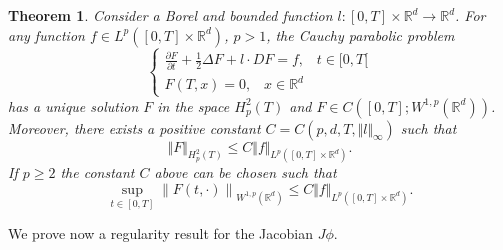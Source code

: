 \documentclass[a4paper,11pt]{article}
\newtheorem{theorem}{Theorem}
\begin{document}

\begin{theorem}
\label{KR} Consider a Borel and bounded function $l:[0,T]\times
\mathbb{R}^{d}\rightarrow \mathbb{R}^{d}$. For any function $f\in
L^{p} ([0,T]\times \mathbb{R}^{d})$, $p>1$, the Cauchy parabolic
problem
\begin{equation}
\left\{ \begin{aligned} \frac{\partial F}{\partial t}+ \frac{1}{2}
\Delta F + l \cdot D F = f,\;\; \; t \in [0,T[ \\ F(T,x)=0,\;\;\; x
\in \mathbb{R} ^d
\end{aligned}\right.   \label{eq:cauchy-parabolic-problem}
\end{equation}
has a unique solution $F$ in the space $H_{p}^{2}(T)$ and $F\in C( [  0,T]
;W^{1,p}(  \mathbb{R}^{d}) )  $. Moreover,
there exists a positive constant $C=C(p,
 d,T,\Vert l\Vert _{\infty
})$ such that
\begin{equation}
\Vert F\Vert _{{H_{p}^{2}(T)}}
\leq C\Vert
 f\Vert _{L^{p} ([0,T]\times \mathbb{R}^{d})}.  \label{bond}
\end{equation}
If $p\ge 2$ the constant $C$ above can be chosen such that
\begin{equation}
\sup_{t\in\left[
0,T\right]  }\left\|  F(  t,\cdot)  \right\|  _{W^{1,p}\left(
\mathbb{R}^{d}\right)  }
\leq C\Vert
 f\Vert _{L^{p} ([0,T]\times \mathbb{R}^{d})}.  \label{bond-sup}
\end{equation}
\end{theorem}
We prove now a  regularity result for the Jacobian $J \phi$.
\end{document}

